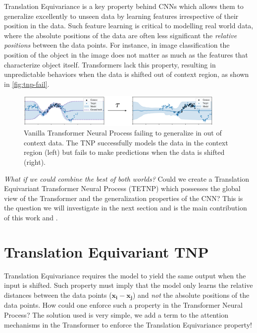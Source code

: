 \documentclass[../../main.tex]{subfiles}
\begin{document}
Translation Equivariance is a key property behind CNNs which allows them to generalize excellently to unseen data by learning features irrespective of their position in the data. Such feature learning is critical to modelling real world data, where the absolute positions of the data are often less significant the \emph{relative positions} between the data points. For instance, in image classification the position of the object in the image does not matter as much as the features  that characterize  object itself. Transformers lack this property, resulting in unpredictable behaviors when the data is shifted out of context region, as shown in \autoref{fig:tnp-fail}.


\begin{figure}[H]
	\centering
	\includegraphics[width=0.9\textwidth]{./tnp-fail.png}
	\caption{Vanilla Transformer Neural Process failing to generalize in out of context data. The TNP successfully models the data in the context region (left) but fails to make predictions when the data is shifted (right).}
	\label{fig:tnp-fail}
\end{figure}

\emph{What if we could combine the best of both worlds?} Could we create a Translation Equivariant Transformer Neural Process (TETNP) which possesses the global view of the Transformer and the generalization properties of the CNN? This is the question we will investigate in the next section and is the main contribution of this work and \cite{anonymous2024translationequivariant}.



\section{Translation Equivariant TNP}
\label{sec:tetnp}

Translation Equivariance requires the model to yield the same output when the input is shifted. Such property must imply that the model only learns the relative distances between the data points ($\bm{x_i} - \bm{x_j}$) and \emph{not} the absolute positions of the data points. How could one enforce such a property in the Transformer Neural Process? The solution used is very simple, we add a term to the attention mechanisms in the Transformer to enforce the Translation Equivariance property!
\end{document}
